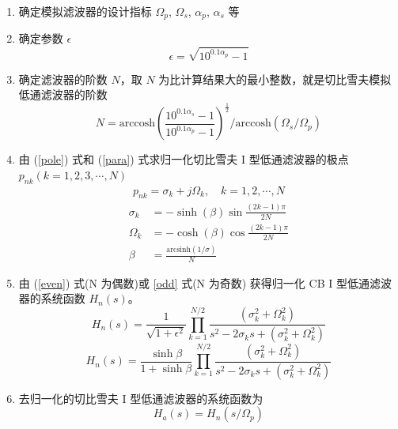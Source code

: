 \documentclass[12pt,AutoFakeBold]{article}
\begin{document}
\begin{enumerate}[1.]
\item 确定模拟滤波器的设计指标 $\Omega_p$, $\Omega_s$, $\alpha_p$, $\alpha_s$ 等

\item 确定参数 $\epsilon$
\begin{equation}
\epsilon=\sqrt{10^{0.1\alpha_p}-1}
\end{equation}

\item 确定滤波器的阶数 $N$，取 $N$ 为比计算结果大的最小整数，就是切比雪夫模拟低通滤波器的阶数
\begin{equation}
N=\mathrm{arccosh}\left(\frac{10^{0.1\alpha_s}-1}{10^{0.1\alpha_p}-1}\right)^{\frac{1}{2}}/\mathrm{arccosh}(\Omega_s/\Omega_p)
\end{equation}

\item 由 (\ref{pole}) 式和 (\ref{para}) 式求归一化切比雪夫 I 型低通滤波器的极点 $p_{nk}(k=1,2,3,\cdots,N)$
\begin{align} \label{pole}
p_{nk}=\sigma_k+j\Omega_k,\quad k=1,2,\cdots,N
\end{align}
%
\begin{subequations}
\label{para}
\begin{align}
\sigma_k&=-\sinh(\beta)\sin\frac{(2k-1)\pi}{2N} \\
\Omega_k&=-\cosh(\beta)\cos\frac{(2k-1)\pi}{2N} \\
\beta&=\frac{\mathrm{arcsinh}(1/\sigma)}{N} 
\end{align}
\end{subequations}

\item 由 (\ref{even}) 式(N 为偶数)或 \ref{odd} 式(N 为奇数) 获得归一化 CB I 型低通滤波器的系统函数 $H_n(s)$。
\begin{equation}
H_n(s)=\frac{1}{\sqrt{1+\epsilon^2}}\prod_{k=1}^{N/2}\frac{(\sigma_k^2+\Omega_k^2)}{s^2-2\sigma_ks+(\sigma_k^2+\Omega_k^2)} \label{even}
\end{equation}
%
\begin{equation}
H_n(s)=\frac{\sinh\beta}{1+\sinh\beta}\prod_{k=1}^{N/2}\frac{(\sigma_k^2+\Omega_k^2)}{s^2-2\sigma_ks+(\sigma_k^2+\Omega_k^2)} \label{odd}
\end{equation}

\item 去归一化的切比雪夫 I 型低通滤波器的系统函数为
\begin{equation}
H_a(s)=H_n(s/\Omega_p)
\end{equation}
\end{enumerate}
\end{document}
